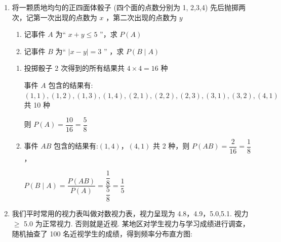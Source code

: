 \begin{enumerate}
\begin{enumerate}
\begin{jieda}
\begin{enumerate}
            所以 $P\left( {A \mid  B}\right)  = \dfrac{P\left( {AB}\right) }{P\left( B\right) } = \dfrac{P\left( {B \mid  A}\right) P\left( A\right) }{P\left( B\right) } = \dfrac{{0.48} \times  {0.54}}{0.36} = {0.72}$ ,
            
            即若此人的成绩为优秀，则此人近视的概率为 0.72 .
        \end{enumerate}
    \end{jieda}

    \item 将一颗质地均匀的正四面体骰子 (四个面的点数分别为 1, 2,3,4) 先后抛掷两次，记第一次出现的点数为 $x$ ，第二次出现的点数为 $y$
    \begin{enumerate}
        \item 记事件 $A$ 为“ $x + y \leq  5$ ”，求 $P\left( A\right)$
        
        \item 记事件 $B$ 为“ $\left| {x - y}\right|  = 3$ ” ，求 $P\left( {B \mid  A}\right)$
    \end{enumerate}
    \begin{jieda}
        \begin{enumerate}
            \item 投掷骰子 2 次得到的所有结果共 $4\times4 = 16$ 种
            
            事件 $A$ 包含的结果有: $\left( {1,1}\right) ,\left( {1,2}\right) ,\left( {1,3}\right) ,\left( {1,4}\right) ,\left( {2,1}\right) ,\left( {2,2}\right) ,\left( {2,3}\right) ,\left( {3,1}\right) ,\left( {3,2}\right) ,\left( {4,1}\right)$ 共 10 种
            
            则 $P\left( A\right)  = \dfrac{10}{16} = \dfrac{5}{8}$

            \item 事件 ${AB}$ 包含的结果有:$( 1,4)$，$(4,1)$ 共 2 种，则 $P\left( {AB}\right)  = \dfrac{2}{16} = \dfrac{1}{8}$ ，
            
            $P\left( {B \mid  A}\right)  = \dfrac{P\left( {AB}\right) }{P\left( A\right) } = \dfrac{\dfrac{1}{8}}{\dfrac{5}{8}} = \dfrac{1}{5}$
        \end{enumerate}
    \end{jieda}
    \item 我们平时常用的视力表叫做对数视力表，视力呈现为 4.8，4.9，5.0,5.1. 视力 $\geq$ 5.0 为正常视力. 否则就是近视. 某地区对学生视力与学习成绩进行调查，随机抽查了 100 名近视学生的成绩，得到频率分布直方图:
    

\end{enumerate}
\end{enumerate}
